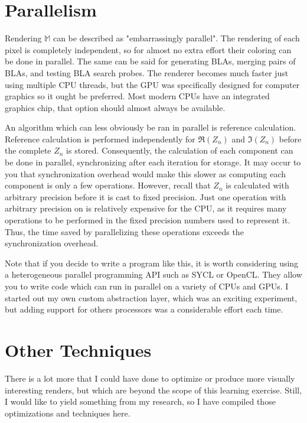 \documentclass{article}
\begin{document}
\section{Parallelism}
\par Rendering $\mathbb{M}$ can be described as "embarrassingly parallel". The rendering of each pixel is completely independent, so for almost no extra effort their coloring can be done in parallel. The same can be said for generating BLAs, merging pairs of BLAs, and testing BLA search probes. The renderer becomes much faster just using multiple CPU threads, but the GPU was specifically designed for computer graphics so it ought be preferred. Most modern CPUs have an integrated graphics chip, that option should almost always be available.
\par An algorithm which can less obviously be ran in parallel is reference calculation. Reference calculation is performed independently for $\Re(Z_n)$ and $\Im(Z_n)$ before the complete $Z_n$ is stored. Consequently, the calculation of each component can be done in parallel, synchronizing after each iteration for storage. It may occur to you that synchronization overhead would make this slower as computing each component is only a few operations. However, recall that $Z_n$ is calculated with arbitrary precision before it is cast to fixed precision. Just one operation with arbitrary precision on is relatively expensive for the CPU, as it requires many operations to be performed in the fixed precision numbers used to represent it. Thus, the time saved by parallelizing these operations exceeds the synchronization overhead.
\par Note that if you decide to write a program like this, it is worth considering using a heterogeneous parallel programming API such as SYCL or OpenCL. They allow you to write code which can run in parallel on a variety of CPUs and GPUs. I started out my own custom abstraction layer, which was an exciting experiment, but adding support for others processors was a considerable effort each time.
\section{Other Techniques}
\par There is a lot more that I could have done to optimize or produce more visually interesting renders, but which are beyond the scope of this learning exercise. Still, I would like to yield something from my research, so I have compiled those optimizations and techniques here. 
\end{document}
